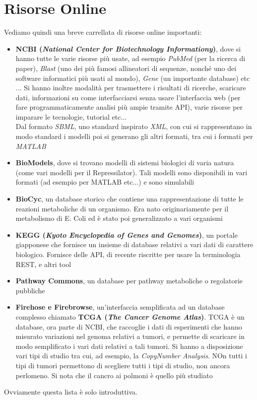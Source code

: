 \documentclass[a4paper,12pt, oneside]{book}
\begin{document}
\section{Risorse Online}
Vediamo quindi una breve carrellata di risorse online importanti:
\begin{itemize}
  \item \textbf{NCBI (\textit{National Center for Biotechnology Informationy})},
  dove si hanno tutte le varie risorse più usate, ad esempio \textit{PubMed}
  (per la ricerca di paper), \textit{Blast} (uno dei più famosi allineatori di
  sequenze, nonché uno dei software informatici più usati al mondo),
  \textit{Gene} (un importante database) etc$\ldots$ Si hanno inoltre modalità
  per trasmettere i risultati di ricerche, scaricare dati, informazioni su
  come interfacciarsi senza usare l'interfaccia web (per fare programmaticamente
  analisi più ampie tramite API), varie risorse per imparare le tecnologie,
  tutorial etc$\ldots$ \\
  Dal formato \textit{SBML}, uno standard inspirato \textit{XML}, con cui si
  rappresentano in modo standard i modelli poi si generano gli altri formati,
  tra cui i formati per \textit{MATLAB}
  \item \textbf{BioModels}, dove si trovano modelli di sistemi biologici di
  varia natura (come vari modelli per il Repressilator). Tali modelli sono
  disponibili in vari formati (ad esempio per MATLAB etc$\ldots$) e sono
  simulabili  
  \item \textbf{BioCyc}, un database storico che contiene una rappresentazione
  di tutte le reazioni metaboliche di un organismo. Era nato originariamente per
  il metabolismo di E. Coli ed è stato poi generalizzato a vari organismi
  \item \textbf{KEGG (\textit{Kyoto Encyclopedia of Genes and Genomes})}, un
  portale giapponese che fornisce un insieme di database relativi a vari dati di
  carattere biologico. Fornisce delle API, di recente riscritte per usare la
  terminologia REST, e altri tool
  \item \textbf{Pathway Commons}, un database per pathway metaboliche o
  regolatorie pubbliche
  \item \textbf{Firehose e Firebrowse}, un'interfaccia semplificata ad un
  database complesso chiamato \textbf{TCGA (\textit{The Cancer Genome
      Atlas})}. TCGA è un database, ora parte di NCBI, che raccoglie i dati di
  esperimenti che hanno misurato variazioni nel genoma relativi a tumori, e
  permette di scaricare in modo semplificato i vari dati relativi a tali
  tumori. Si hanno a disposizione vari tipi di studio tra cui, ad esempio, la
  \textit{CopyNumber Analysis}. NOn tutti i tipi di tumori permettono di
  scegliere tutti i tipi di studio, non ancora perlomeno. Si nota che il cancro
  ai polmoni è quello più studiato 
\end{itemize}
Ovviamente questa lista è solo introduttiva.
\end{document}
